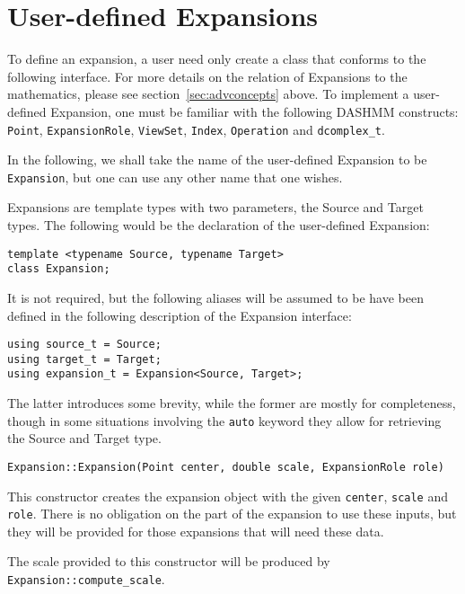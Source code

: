 \section{User-defined Expansions}

To define an expansion, a user need only create a class that conforms to the
following interface. For more details on the relation of Expansions to the
mathematics, please see section~\ref{sec:advconcepts} above. To implement a
user-defined Expansion, one must be familiar with the following DASHMM
constructs: \texttt{Point}, \texttt{ExpansionRole}, \texttt{ViewSet},
\texttt{Index}, \texttt{Operation} and \texttt{dcomplex\_t}.

In the following, we shall take the name of the user-defined Expansion to
be \texttt{Expansion}, but one can use any other name that one wishes.

Expansions are template types with two parameters, the Source and Target
types. The following would be the declaration of the user-defined Expansion:

\begin{lstlisting}
template <typename Source, typename Target>
class Expansion;
\end{lstlisting}

\noindent It is not required, but the following aliases will be assumed to be
have been defined in the following description of the Expansion interface:

\begin{lstlisting}
using source_t = Source;
using target_t = Target;
using expansion_t = Expansion<Source, Target>;
\end{lstlisting}

\noindent The latter introduces some brevity, while the former are mostly
for completeness, though in some situations involving the \texttt{auto} keyword
they allow for retrieving the Source and Target type.

\begin{lstlisting}
Expansion::Expansion(Point center, double scale, ExpansionRole role)
\end{lstlisting}

This constructor creates the expansion object with the given \texttt{center},
\texttt{scale} and \texttt{role}. There is no obligation on the part of the
expansion to use these inputs, but they will be provided for those expansions
that will need these data.

The scale provided to this constructor will be produced by
\texttt{Expansion::compute\_scale}.

